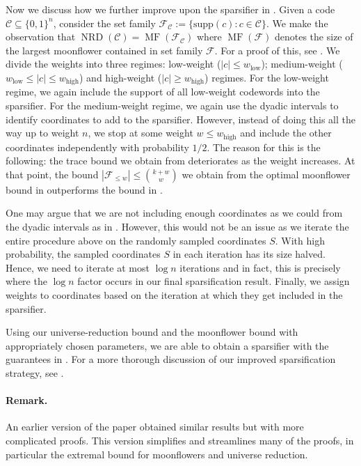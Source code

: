 \documentclass{article}
\DeclareMathOperator{\NRD}{NRD}
\DeclareMathOperator{\MF}{MF}
\DeclareMathOperator{\high}{\mathrm{high}}
\DeclareMathOperator{\low}{\mathrm{low}}
\newcommand{\<}{\langle}
\renewcommand{\>}{\rangle}
\newcommand{\calC}{\mathcal{C}}
\newcommand{\calF}{\mathcal{F}}
\newcommand{\supp}{\mathrm{supp}}
\begin{document}
Now we discuss how we further improve upon the sparsifier in \cite{BG25}. Given a code $\calC \subseteq \{0, 1\}^n$, consider the set family $\calF_{\calC}:= \{\supp (c): c \in \calC\}$. We make the observation that $\NRD (\calC) = \MF (\calF_{\calC})$ where $\MF(\calF)$ denotes the size of the largest moonflower contained in set family $\calF$. For a proof of this, see . We divide the weights into three regimes: low-weight ($|c| \leq w_{\low}$); medium-weight ($w_{\low}\leq |c| \leq w_{\high}$) and high-weight ($|c| \geq w_{\high}$) regimes. For the low-weight regime, we again include the support of all low-weight codewords into the sparsifier. For the medium-weight regime, we again use the dyadic intervals to identify coordinates to add to the sparsifier. However, instead of doing this all the way up to weight $n$, we stop at some weight $w \leq w_{\high}$ and include the other coordinates independently with probability $1/2$. The reason for this is the following: the trace bound we obtain from   deteriorates as the weight increases. At that point, the bound $|\calF_{\leq w}| \leq \binom{k+w}{w}$ we obtain from the optimal moonflower bound in   outperforms the bound in .

One may argue that we are not including enough coordinates as we could from the dyadic intervals as in \cite{BG25}. However, this would not be an issue as we iterate the entire procedure above on the randomly sampled coordinates $S$. With high probability, the sampled coordinates $S$ in each iteration has its size halved. Hence, we need to iterate at most $\log n$ iterations and in fact, this is precisely where the $\log n$ factor occurs in our final sparsification result. Finally, we assign weights to coordinates based on the iteration at which they get included in the sparsifier. 

Using our  universe-reduction bound  and the moonflower bound  with appropriately chosen parameters, we are able to obtain a sparsifier with the guarantees in . For a more thorough discussion of our improved sparsification strategy, see .

\paragraph{Remark.} 
An earlier version of the paper obtained similar results but with more complicated proofs. This version simplifies and streamlines many of the proofs, in particular the extremal bound for moonflowers and universe reduction.
\end{document}
